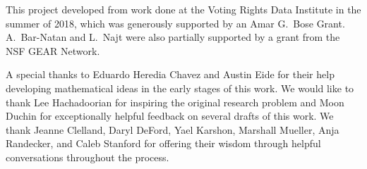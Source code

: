 
This project developed from work done at the Voting Rights Data Institute in the summer of 2018, which was generously supported by an Amar G.\ Bose Grant.  A.\ Bar-Natan and L.\ Najt were also partially supported by a grant from the NSF GEAR Network.

A special thanks to Eduardo Heredia Chavez and Austin Eide for their help developing mathematical ideas in the early stages of this work. We would like to thank Lee Hachadoorian for inspiring the original research problem and Moon Duchin for exceptionally helpful feedback on several drafts of this work.  We thank Jeanne Clelland, Daryl DeFord, Yael Karshon, Marshall Mueller, Anja Randecker, and Caleb Stanford for offering their wisdom through helpful conversations throughout the process.